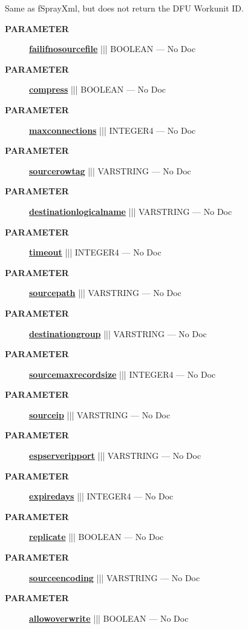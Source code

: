 \par





Same as fSprayXml, but does not return the DFU Workunit ID.






\par
\begin{description}
\item [\colorbox{tagtype}{\color{white} \textbf{\textsf{PARAMETER}}}] \textbf{\underline{failifnosourcefile}} ||| BOOLEAN --- No Doc
\item [\colorbox{tagtype}{\color{white} \textbf{\textsf{PARAMETER}}}] \textbf{\underline{compress}} ||| BOOLEAN --- No Doc
\item [\colorbox{tagtype}{\color{white} \textbf{\textsf{PARAMETER}}}] \textbf{\underline{maxconnections}} ||| INTEGER4 --- No Doc
\item [\colorbox{tagtype}{\color{white} \textbf{\textsf{PARAMETER}}}] \textbf{\underline{sourcerowtag}} ||| VARSTRING --- No Doc
\item [\colorbox{tagtype}{\color{white} \textbf{\textsf{PARAMETER}}}] \textbf{\underline{destinationlogicalname}} ||| VARSTRING --- No Doc
\item [\colorbox{tagtype}{\color{white} \textbf{\textsf{PARAMETER}}}] \textbf{\underline{timeout}} ||| INTEGER4 --- No Doc
\item [\colorbox{tagtype}{\color{white} \textbf{\textsf{PARAMETER}}}] \textbf{\underline{sourcepath}} ||| VARSTRING --- No Doc
\item [\colorbox{tagtype}{\color{white} \textbf{\textsf{PARAMETER}}}] \textbf{\underline{destinationgroup}} ||| VARSTRING --- No Doc
\item [\colorbox{tagtype}{\color{white} \textbf{\textsf{PARAMETER}}}] \textbf{\underline{sourcemaxrecordsize}} ||| INTEGER4 --- No Doc
\item [\colorbox{tagtype}{\color{white} \textbf{\textsf{PARAMETER}}}] \textbf{\underline{sourceip}} ||| VARSTRING --- No Doc
\item [\colorbox{tagtype}{\color{white} \textbf{\textsf{PARAMETER}}}] \textbf{\underline{espserveripport}} ||| VARSTRING --- No Doc
\item [\colorbox{tagtype}{\color{white} \textbf{\textsf{PARAMETER}}}] \textbf{\underline{expiredays}} ||| INTEGER4 --- No Doc
\item [\colorbox{tagtype}{\color{white} \textbf{\textsf{PARAMETER}}}] \textbf{\underline{replicate}} ||| BOOLEAN --- No Doc
\item [\colorbox{tagtype}{\color{white} \textbf{\textsf{PARAMETER}}}] \textbf{\underline{sourceencoding}} ||| VARSTRING --- No Doc
\item [\colorbox{tagtype}{\color{white} \textbf{\textsf{PARAMETER}}}] \textbf{\underline{allowoverwrite}} ||| BOOLEAN --- No Doc
\end{description}







